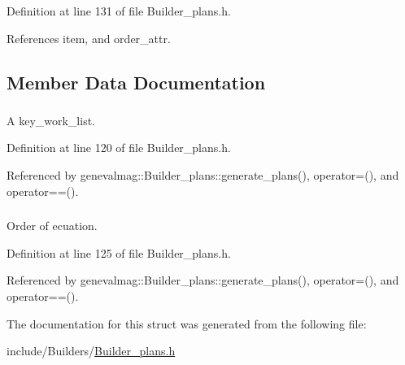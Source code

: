 Definition at line 131 of file Builder\_\-plans.h.



References item, and order\_\-attr.



\subsection{Member Data Documentation}
\hypertarget{structgenevalmag_1_1i__w_acb047851d2d48bfa097543a5a891e995}{
\subsubsection[{item}]{}}
\label{structgenevalmag_1_1i__w_acb047851d2d48bfa097543a5a891e995}


A key\_\-work\_\-list. 



Definition at line 120 of file Builder\_\-plans.h.



Referenced by genevalmag::Builder\_\-plans::generate\_\-plans(), operator=(), and operator==().

\hypertarget{structgenevalmag_1_1i__w_aa3b6c0dee2aa7ce5808ff3d7068e20e9}{
\subsubsection[{order\_\-attr}]{}}
\label{structgenevalmag_1_1i__w_aa3b6c0dee2aa7ce5808ff3d7068e20e9}


Order of ecuation. 



Definition at line 125 of file Builder\_\-plans.h.



Referenced by genevalmag::Builder\_\-plans::generate\_\-plans(), operator=(), and operator==().



The documentation for this struct was generated from the following file:\begin{DoxyCompactItemize}
\item 
include/Builders/\hyperlink{Builder__plans_8h}{Builder\_\-plans.h}\end{DoxyCompactItemize}
